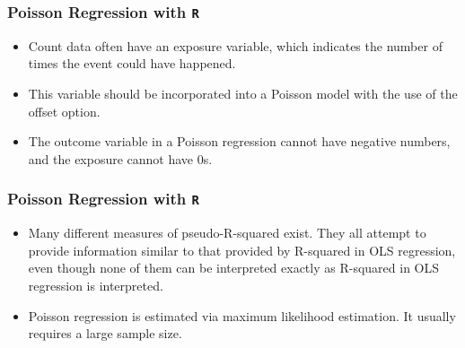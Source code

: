 \documentclass[00-GLMregslides.tex]{subfiles}
\begin{document}
\begin{frame}[fragile]
	\frametitle{Poisson Regression with \texttt{R}}
	\Large
	\begin{itemize} 
\item Count data often have an exposure variable, which indicates the number of times the event could have happened. 
\item This variable should be incorporated into a Poisson model with the use of the offset option.
\item The outcome variable in a Poisson regression cannot have negative numbers, and the exposure cannot have 0s.
\end{itemize}
\end{frame}
\begin{frame}[fragile]
	\frametitle{Poisson Regression with \texttt{R}}
	\Large
	\begin{itemize} 

\item Many different measures of pseudo-R-squared exist. They all attempt to provide information similar to that provided by R-squared in OLS regression, even though none of them can be interpreted exactly as R-squared in OLS regression is interpreted.
 
\item Poisson regression is estimated via maximum likelihood estimation. It usually requires a large sample size. 
\end{itemize}
\end{frame}

\end{document}
